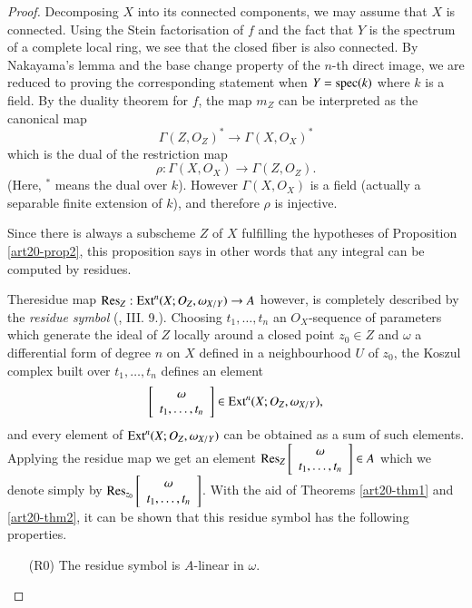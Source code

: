 \begin{proof}
Decomposing $X$ into its connected components, we may assume that $X$ is connected. Using the Stein factorisation of $f$ and the fact that $Y$ is the spectrum of a complete local ring, we see that the closed fiber is also connected. By Nakayama's lemma and the base change property of the $n$-th direct image, we are reduced to proving the corresponding statement when $Y=\operatorname{\mathrm{spec}} (k)$ where $k$ is a field. By the duality theorem for $f$, the map $m_{Z}$ can be interpreted as the canonical map
$$
\Gamma(Z,O_{Z})^{*}\to \Gamma(X,O_{X})^{*}
$$
which is the dual of the restriction map
$$
\rho :\Gamma(X,O_{X})\to \Gamma(Z,O_{Z}).
$$
(Here, $^*$ means the dual over $k$). However $\Gamma(X,O_{X})$ is a field (actually a separable finite extension of $k$), and therefore $\rho$ is injective.

Since there is always a subscheme $Z$ of $X$ fulfilling the hypotheses of Proposition \ref{art20-prop2}, this proposition says in other words that any integral can be computed by residues.

The\pageoriginale residue map $\operatorname{\mathrm{Res}}_{Z}:\operatorname{\mathrm{Ext}}^{n}(X;O_{Z},\omega_{X/Y})\to A$ however, is completely described by the {\em residue symbol} (\cite{art20-key1}, III. 9.). Choosing $t_{1},\ldots,t_{n}$ an $O_{X}$-sequence of parameters which generate the ideal of $Z$ locally around a closed point $z_{0}\in Z$ and $\omega$ a differential form of degree $n$ on $X$ defined in a neighbourhood $U$ of $z_{0}$, the Koszul complex built over $t_{1},\ldots,t_{n}$ defines an element
$$
\left[\begin{array}{c}
\omega\\
t_{1},\ldots,t_{n}
\end{array}\right]
\in \operatorname{\mathrm{Ext}}^{n}(X;O_{Z},\omega_{X/Y}),
$$
and every element of $\operatorname{\mathrm{Ext}}^{n}(X;O_{Z},\omega_{X/Y})$ can be obtained as a sum of such elements. Applying the residue map we get an element $\operatorname{\mathrm{Res}}_{Z}\left[\begin{array}{c} \omega\\ t_{1},\ldots,t_{n}\end{array}\right]\in A$ which we denote simply by $\operatorname{\mathrm{Res}}_{z_{0}}\left[\begin{array}{c} \omega\\ t_{1},\ldots,t_{n}\end{array}\right]$. With the aid of Theorems \ref{art20-thm1} and \ref{art20-thm2}, it can be shown that this residue symbol has the following properties.
\begin{itemize}
\item[(R0)] The residue symbol is $A$-linear in $\omega$.


\end{itemize}
\end{proof}
